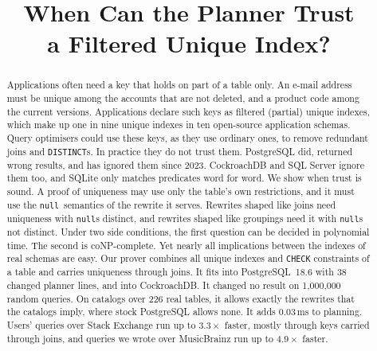 \documentclass[conference]{IEEEtran}
\theoremstyle{definition}
\newcommand{\sql}[1]{\texttt{#1}}
\newcommand{\nul}{\texttt{null}}
\begin{document}
\title{When Can the Planner Trust\\ a Filtered Unique Index?}

\author{
\and
{}
}

\maketitle

\begin{abstract}
Applications often need a key that holds on part of a table only. An e-mail address must be unique among the
accounts that are not deleted, and a product code among the current versions. Applications declare such keys as
filtered (partial) unique indexes, which make up one in nine unique indexes in ten open-source application schemas.
Query optimisers could use these keys, as they use ordinary ones, to remove redundant joins and \sql{DISTINCT}s. In
practice they do not trust them. PostgreSQL did, returned wrong results, and has ignored them since 2023.
CockroachDB and SQL Server ignore them too, and SQLite only matches predicates word for word. We show when trust is sound. A proof of
uniqueness may use only the table's own restrictions, and it must use the \nul\ semantics of the rewrite it serves.
Rewrites shaped like joins need uniqueness with \nul s distinct, and rewrites shaped like groupings need it with \nul s
not distinct. Under two side conditions, the first question can be decided in polynomial time. The second is coNP-complete. Yet nearly
all implications between the indexes of real schemas are easy. Our prover combines all unique indexes and \sql{CHECK}
constraints of a table and carries uniqueness through joins. It fits into PostgreSQL~18.6 with 38 changed planner lines,
and into CockroachDB. It changed no result on 1{,}000{,}000 random queries. On catalogs over 226 real tables, it allows
exactly the rewrites that the catalogs imply, where stock PostgreSQL allows none. It adds 0.03\,ms to planning. Users' queries over
Stack Exchange run up to $3.3\times$ faster, mostly through keys carried through joins, and queries we wrote over
MusicBrainz run up to $4.9\times$ faster.
\end{abstract}
\end{document}
